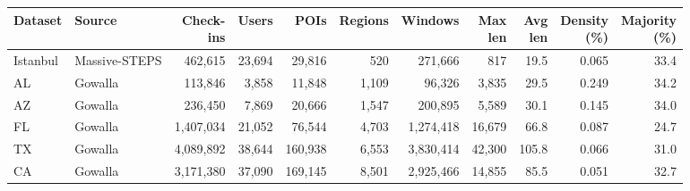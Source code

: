 \begin{table}[htbp]
\begin{adjustbox}{max width=\textwidth}
\begin{tabular}{l l r r r r r r r r r}
\toprule
\textbf{Dataset} & \textbf{Source} & \shortstack[r]{\textbf{Check-}\\\textbf{ins}} & \textbf{Users} & \textbf{POIs} &
\textbf{Regions} & \textbf{Windows} & \shortstack[r]{\textbf{Max}\\\textbf{len}} & \shortstack[r]{\textbf{Avg}\\\textbf{len}} & \shortstack[r]{\textbf{Density}\\\textbf{(\%)}} & \shortstack[r]{\textbf{Majority}\\\textbf{(\%)}} \\
\midrule
Istanbul & Massive-STEPS &   462{,}615 & 23{,}694 &  29{,}816 &     520 &   271{,}666 &     817 &  19.5 & 0.065 & 33.4 \\
AL       & Gowalla       &   113{,}846 &  3{,}858 &  11{,}848 & 1{,}109 &    96{,}326 & 3{,}835 &  29.5 & 0.249 & 34.2 \\
AZ       & Gowalla       &   236{,}450 &  7{,}869 &  20{,}666 & 1{,}547 &   200{,}895 & 5{,}589 &  30.1 & 0.145 & 34.0 \\
FL       & Gowalla       & 1{,}407{,}034 & 21{,}052 &  76{,}544 & 4{,}703 & 1{,}274{,}418 & 16{,}679 &  66.8 & 0.087 & 24.7 \\
TX       & Gowalla       & 4{,}089{,}892 & 38{,}644 & 160{,}938 & 6{,}553 & 3{,}830{,}414 & 42{,}300 & 105.8 & 0.066 & 31.0 \\
CA       & Gowalla       & 3{,}171{,}380 & 37{,}090 & 169{,}145 & 8{,}501 & 2{,}925{,}466 & 14{,}855 &  85.5 & 0.051 & 32.7 \\
\bottomrule
\end{tabular}
\end{adjustbox}
\end{table}
